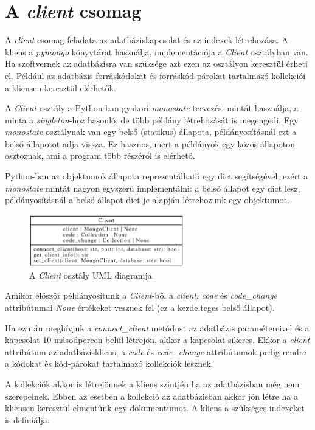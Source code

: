 \section{A \emph{client} csomag}

A \emph{client} csomag feladata az adatbáziskapcsolat és az indexek létrehozása.
A kliens a \emph{pymongo} könyvtárat használja, implementációja a \emph{Client} osztályban van.
Ha szoftvernek az adatbázisra van szüksége azt ezen az osztályon keresztül érheti el.
Például az adatbázis forráskódokat és forráskód-párokat tartalmazó kollekciói a kliensen
keresztül elérhetők.

A \emph{Client} osztály a Python-ban gyakori \emph{monostate} \cite{monostatePattern}
tervezési mintát használja, a minta a \emph{singleton}-hoz hasonló,
de több példány létrehozását is megengedi.
Egy \emph{monostate} osztálynak van egy belső (statikus) állapota,
példányosításnál ezt a belső állapotot adja vissza.
Ez hasznos, mert a példányok egy közös állapoton osztoznak, ami a program több részéről is elérhető.

Python-ban az objektumok állapota reprezentálható egy dict segítségével,
ezért a \emph{monostate} mintát nagyon egyszerű implementálni:
a belső állapot egy dict lesz, példányosításnál a belső állapot dict-je alapján létrehozunk egy objektumot.

\begin{figure}[H]
	\centering
	\includegraphics[width=0.6\textwidth]{images/uml/Client.eps}
	\caption{A \emph{Client} osztály UML diagramja}
\end{figure}

Amikor először példányosítunk a \emph{Client}-ből a \emph{client}, \emph{code} és \emph{code\_change}
attribútumai \emph{None} értékeket vesznek fel (ez a kezdelteges belső állapot).

Ha ezután meghívjuk a \emph{connect\_client} metódust az adatbázis paramétereivel
és a kapcsolat 10 másodpercen belül létrejön, akkor a kapcsolat sikeres.
Ekkor
a \emph{client} attribútum az adatbáziskliens,
a \emph{code} és \emph{code\_change} attribútumok pedig rendre
a kódokat és kód-párokat tartalmazó kollekciók lesznek.

A kollekciók akkor is létrejönnek a kliens szintjén ha az adatbázisban még nem szerepelnek.
Ebben az esetben a kollekció az adatbázisban akkor jön létre ha a kliensen keresztül elmentünk egy dokumentumot.
A kliens a szükséges indexeket is definiálja.

